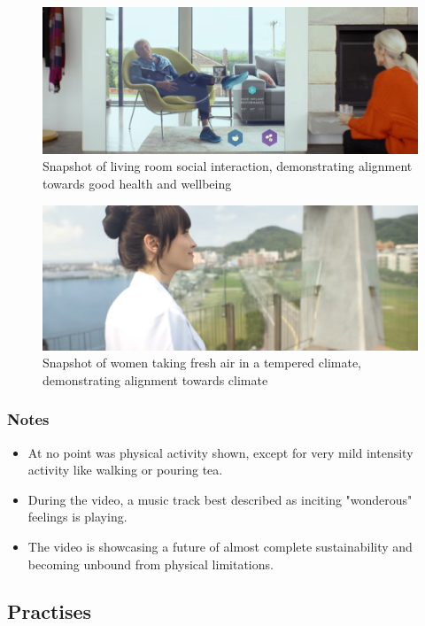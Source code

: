 \begin{figure}[H]
    \centering
    \includegraphics[width=1\textwidth]{images/ProHealthAndSocialInteraction.png}
    \caption{Snapshot of living room social interaction, demonstrating alignment towards good health and wellbeing}
    \label{fig:social}
\end{figure} 

\begin{figure}[H]
    \centering
    \includegraphics[width=1\textwidth]{images/ProClimate.png}
    \caption{Snapshot of women taking fresh air in a tempered climate, demonstrating alignment towards climate}
    \label{fig:fresh}
\end{figure} 

\subsubsection*{Notes}
\begin{itemize}
    \item At no point was physical activity shown, except for very mild intensity activity like walking or pouring tea.
    \item During the video, a music track best described as inciting "wonderous" feelings is playing.
    \item The video is showcasing a future of almost complete sustainability and becoming unbound from physical limitations.
\end{itemize}

\subsection{Practises}


